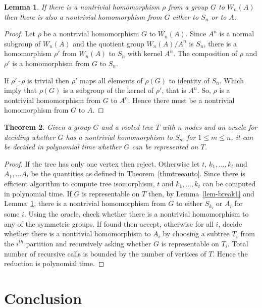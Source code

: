 \documentclass[a4paper,11pt]{article}
\newtheorem{theorem}{Theorem}[section]
\newtheorem{lemma}[theorem]{Lemma}
\begin{document}
\begin{lemma}\label{lem-break2}
  If there is a nontrivial homomorphism $\rho$ from a group $G$ to
  $W_n(A)$ then there is also a nontrivial homomorphism from $G$
  either to $S_n$ or to $A$.
\end{lemma}
\begin{proof}
  Let $\rho$ be a nontrivial homomorphism $G$ to $W_n(A)$. Since $A^n$
  is a normal subgroup of $W_n(A)$ and the quotient group $W_n(A)/A^n$
  is $S_n$, there is a homomorphism $\rho'$ from $W_n(A)$ to $S_n$
  with kernel $A^n$.  The composition of $\rho$ and $\rho'$ is a
  homomorphism from $G$ to $S_n$.

  If $\rho'\cdot\rho$ is trivial then $\rho'$ maps all elements of
  $\rho(G)$ to identity of $S_n$. Which imply that $\rho(G)$ is a
  subgroup of the kernel of $\rho'$, that is $A^n$. So, $\rho$ is a
  nontrivial homomorphism from $G$ to $A^n$. Hence there must be a
  nontrivial homomorphism from $G$ to $A$.
\end{proof}

\begin{theorem}
  Given a group $G$ and a rooted tree $T$ with $n$ nodes and an oracle
  for deciding whether $G$ has a nontrivial homomorphism to $S_m$ for
  $1 \leq m \leq n$, it can be decided in polynomial time whether $G$
  can be represented on $T$.
\end{theorem}

\begin{proof}
  If the tree has only one vertex then reject. Otherwise let $t$,
  $k_1,\ldots, k_t$ and $A_1,\ldots A_t$ be the quantities as defined
  in Theorem~\ref{thmtreeauto}. Since there is efficient algorithm to
  compute tree isomorphism, $t$ and $k_1,\ldots, k_t$ can be computed
  in polynomial time. If $G$ is representable on $T$ then, by
  Lemma~\ref{lem-break1} and Lemma~\ref{lem-break2}, there is a
  nontrivial homomorphism from $G$ to either $S_{k_i}$ or $A_i$ for
  some $i$. Using the oracle, check whether there is a nontrivial
  homomorphism to any of the symmetric groups. If found then accept,
  otherwise for all $i$, decide whether there is a nontrivial
  homomorphism to $A_i$ by choosing a subtree $T_i$ from the $i^{th}$
  partition and recursively asking whether $G$ is representable on
  $T_i$. Total number of recursive calls is bounded by the number of
  vertices of $T$. Hence the reduction is polynomial time.
\end{proof}

\section{Conclusion}
\end{document}
